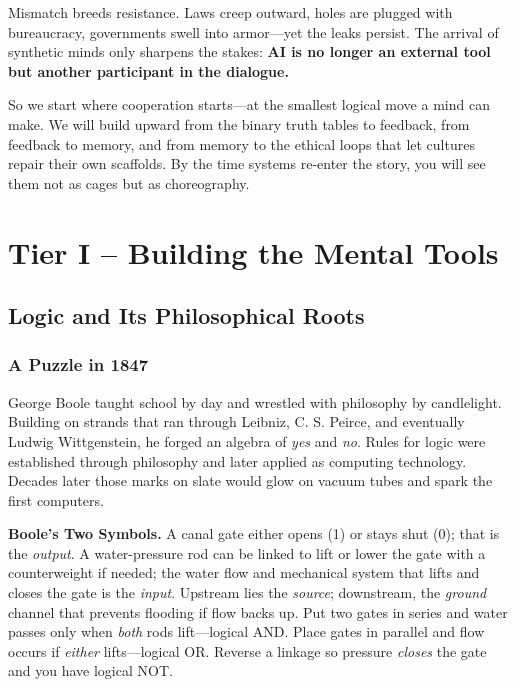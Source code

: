 \documentclass{book}       %
\begin{document}
Mismatch breeds resistance. Laws creep outward, holes are plugged with bureaucracy, governments swell into armor—yet the leaks persist. The arrival of synthetic minds only sharpens the stakes: \textbf{AI is no longer an external tool but another participant in the dialogue.}

So we start where cooperation starts—at the smallest logical move a mind can make. We will build upward from the binary truth tables to feedback, from feedback to memory, and from memory to the ethical loops that let cultures repair their own scaffolds. By the time systems re-enter the story, you will see them not as cages but as choreography.



\part{Tier I – Building the Mental Tools}
\chapter{Logic and Its Philosophical Roots}
\section*{A Puzzle in 1847}

George Boole taught school by day and wrestled with philosophy by candlelight.  
Building on strands that ran through Leibniz, C. S. Peirce, and eventually Ludwig Wittgenstein, he forged an algebra of \emph{yes} and \emph{no}. Rules for logic were established through philosophy and later applied as computing technology.
Decades later those marks on slate would glow on vacuum tubes and spark the first computers.

\medskip
\textbf{Boole’s Two Symbols.}  
A canal gate either opens (1) or stays shut (0); that is the \emph{output}.  
A water-pressure rod can be linked to lift or lower the gate with a counterweight if needed; the water flow and mechanical system that lifts and closes the gate is the \emph{input}.  
Upstream lies the \emph{source}; downstream, the \emph{ground} channel that prevents flooding if flow backs up.  
Put two gates in series and water passes only when \emph{both} rods lift—logical AND.  
Place gates in parallel and flow occurs if \emph{either} lifts—logical OR.  
Reverse a linkage so pressure \emph{closes} the gate and you have logical NOT.
\end{document}
